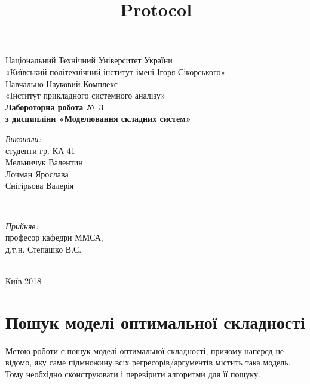 \documentclass[11pt]{article}
\title{Protocol}
\begin{document}
    
    
    \begin{titlepage} 
\center

{\large
Національний Технічний Університет України\\[0.2cm]
«Київський політехнічний інститут імені Ігоря Сікорського»\\[0.2cm]
Навчально-Науковий Комплекс \\[0.2cm]
«Інститут прикладного системного аналізу»
}\\[4cm] %


{ \LARGE \bfseries
Лабороторна робота № 3 \\[0.4cm]
з дисципліни «Моделювання складних систем»
}\\[5cm] %

\begin{minipage}{0.4\textwidth}
\begin{flushleft} \large
\emph{Виконали:} \\
студенти гр. КА-41 \\
Мельничук Валентин \\
Лочман Ярослава  \\
Снігірьова Валерія
\end{flushleft}
\end{minipage}
~
\begin{minipage}{0.4\textwidth}
\begin{flushright} \large
\emph{Прийняв:} \\
професор кафедри ММСА, \\
д.т.н. Степашко В.С. \\
\end{flushright}
\end{minipage}\\[5cm]

Київ 2018

\vfill %

\end{titlepage}

    \section{Пошук моделі оптимальної
складності}\label{ux43fux43eux448ux443ux43a-ux43cux43eux434ux435ux43bux456-ux43eux43fux442ux438ux43cux430ux43bux44cux43dux43eux457-ux441ux43aux43bux430ux434ux43dux43eux441ux442ux456}

    Метою роботи є пошук моделі оптимальної складності, причому наперед не
відомо, яку саме підмножину всіх регресорів/аргументів містить така
модель. Тому необхідно сконструювати і перевірити алгоритми для її
пошуку.
\end{document}
